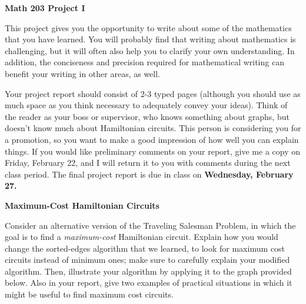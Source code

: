 \documentclass[11pt]{article}
\begin{document}
\centerline{\bf Math 203 Project I}

This project gives you the opportunity to write about some of the mathematics  
that you have learned. You will probably find that writing about  
mathematics is challenging, but it will often also help you to clarify your  
own understanding. In addition, the conciseness and precision required for 
mathematical writing can benefit your writing in other areas, as well.

Your project report should consist of 2-3 typed pages (although you
should use as much space as you think necessary to adequately convey
your ideas). Think of the  
reader as your boss or supervisor, who knows something about graphs,
but doesn't know much about Hamiltonian circuits. This person is 
considering you for a promotion, so you want to make a good impression
of how well you can explain things. 
If you would like preliminary comments on your  
report, give me a copy on Friday, February 22, and I will return it to you  
with comments during the next class period. The final project report is  
due in class on {\bf Wednesday, February 27.}

\vspace{.5in}
\centerline{\bf Maximum-Cost Hamiltonian Circuits}

Consider an alternative version of the Traveling Salesman Problem, in  
which the goal is to find a \emph{maximum-cost} Hamiltonian circuit.   
Explain how you would change the sorted-edges algorithm that we
learned, to look for maximum
cost circuits instead of minimum ones; make sure to  
carefully explain your modified algorithm.  Then, illustrate your  
algorithm by applying it to the graph provided below.  Also in your  
report, give two examples of practical situations in which it might 
be useful to find maximum cost circuits.



\leavevmode
\epsfxsize=4in
\centerline{}
\end{document}
